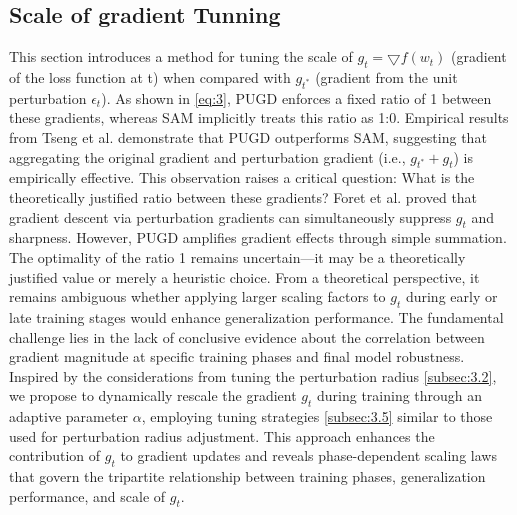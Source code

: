 \documentclass[10pt,twocolumn,letterpaper]{article}
\begin{document}
\subsection{Scale of gradient Tunning}
\label{subsec:3.4}
This section introduces a method for tuning the scale of $g_t = \bigtriangledown f (w_t)$ (gradient of the loss function at t) when compared with $g_{t^{*}}$ (gradient from the unit perturbation $\epsilon_{t}$). As shown in \eqref{eq:3}, PUGD enforces a fixed ratio of 1 between these gradients, whereas SAM implicitly treats this ratio as 1:0. Empirical results from Tseng et al. \cite{4308316} demonstrate that PUGD outperforms SAM, suggesting that aggregating the original gradient and perturbation gradient (i.e., $g_{t^{*}} + g_t$) is empirically effective. This observation raises a critical question: What is the theoretically justified ratio between these gradients? Foret et al. \cite{foret2021sharpnessawareminimizationefficientlyimproving} proved that gradient descent via perturbation gradients can simultaneously suppress $g_t$ and sharpness. However, PUGD amplifies gradient effects through simple summation. The optimality of the ratio 1 remains uncertain—it may be a theoretically justified value or merely a heuristic choice. From a theoretical perspective, it remains ambiguous whether applying larger scaling factors to $g_t$ during early or late training stages would enhance generalization performance. The fundamental challenge lies in the lack of conclusive evidence about the correlation between gradient magnitude at specific training phases and final model robustness. Inspired by the considerations from tuning the perturbation radius \ref{subsec:3.2}, we propose to dynamically rescale the gradient $g_t$ during training through an adaptive parameter $\alpha$, employing tuning strategies \ref{subsec:3.5} similar to those used for perturbation radius adjustment. This approach enhances the contribution of $g_t$ to gradient updates and reveals phase-dependent scaling laws that govern the tripartite relationship between training phases, generalization performance, and scale of $g_t$.
\end{document}
